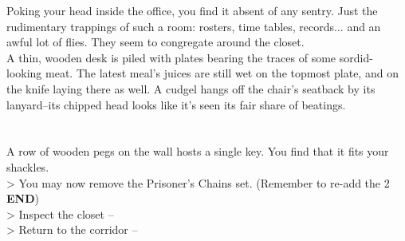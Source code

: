 Poking your head inside the office, you find it absent of any sentry. Just the rudimentary trappings of such a room: rosters, time tables, records... and an awful lot of flies. They seem to congregate around the closet.\\

A thin, wooden desk is piled with plates bearing the traces of some sordid-looking meat. The latest meal’s juices are still wet on the topmost plate, and on the knife laying there as well. A cudgel hangs off the chair’s seatback by its lanyard--its chipped head looks like it’s seen its fair share of beatings.\\
\\
\\

A row of wooden pegs on the wall hosts a single key. You find that it fits your shackles.\\
> You may now remove the Prisoner’s Chains set. (Remember to re-add the 2 \textbf{END})\\

> Inspect the closet --  \\
> Return to the corridor -- 